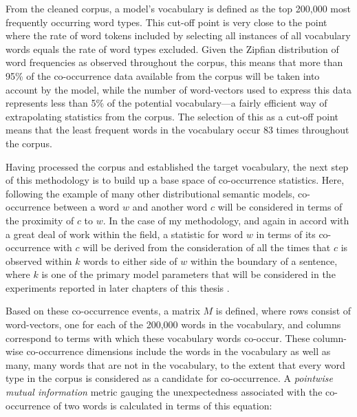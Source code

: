 From the cleaned corpus, a model's vocabulary is defined as the top 200,000 most frequently occurring word types.  This cut-off point is very close to the point where the rate of word tokens included by selecting all instances of all vocabulary words equals the rate of word types excluded.  Given the Zipfian distribution of word frequencies as observed throughout the corpus, this means that more than 95\% of the co-occurrence data available from the corpus will be taken into account by the model, while the number of word-vectors used to express this data represents less than 5\% of the potential vocabulary---a fairly efficient way of extrapolating statistics from the corpus.  The selection of this as a cut-off point means that the least frequent words in the vocabulary occur 83 times throughout the corpus.

Having processed the corpus and established the target vocabulary, the next step of this methodology is to build up a base space of co-occurrence statistics.  Here, following the example of many other distributional semantic models, co-occurrence between a word $w$ and another word $c$ will be considered in terms of the proximity of $c$ to $w$.  In the case of my methodology, and again in accord with a great deal of work within the field, a statistic for word $w$ in terms of its co-occurrence with $c$ will be derived from the consideration of all the times that $c$ is observed within $k$ words to either side of $w$ within the boundary of a sentence, where $k$ is one of the primary model parameters that will be considered in the experiments reported in later chapters of this thesis .   \cite{KielaEA2014} 

Based on these co-occurrence events, a matrix $M$ is defined, where rows consist of word-vectors, one for each of the 200,000 words in the vocabulary, and columns correspond to terms with which these vocabulary words co-occur.  These column-wise co-occurrence dimensions include the words in the vocabulary as well as many, many words that are not in the vocabulary, to the extent that every word type in the corpus is considered as a candidate for co-occurrence.  A \emph{pointwise mutual information} metric gauging the unexpectedness associated with the co-occurrence of two words is calculated in terms of this equation:

